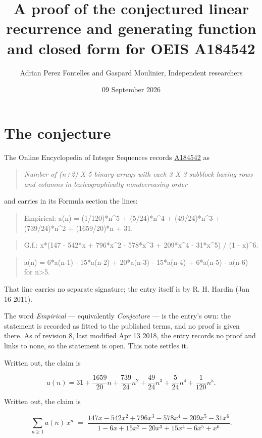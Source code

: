 \documentclass[11pt]{article}
\title{A proof of the conjectured linear recurrence and generating function and closed form for OEIS A184542}
\author{Adrian Perez Fontelles and Gaspard Moulinier, Independent researchers}
\date{09 September 2026}
\theoremstyle{definition}
\begin{document}
\maketitle
\section{The conjecture}

The Online Encyclopedia of Integer Sequences records \href{https://oeis.org/A184542}{A184542} as

\begin{quote}\itshape Number of (n+2) X 5 binary arrays with each 3 X 3 subblock having rows and columns in lexicographically nondecreasing order\end{quote}

and carries in its Formula section the lines:

\begin{quote}\ttfamily Empirical: a(n) = (1/120)*n\textasciicircum{}5 + (5/24)*n\textasciicircum{}4 + (49/24)*n\textasciicircum{}3 + (739/24)*n\textasciicircum{}2 + (1659/20)*n + 31.\end{quote}

\begin{quote}\ttfamily G.f.: x*(147 - 542*x + 796*x\textasciicircum{}2 - 578*x\textasciicircum{}3 + 209*x\textasciicircum{}4 - 31*x\textasciicircum{}5) / (1 - x)\textasciicircum{}6.\end{quote}

\begin{quote}\ttfamily a(n) = 6*a(n-1) - 15*a(n-2) + 20*a(n-3) - 15*a(n-4) + 6*a(n-5) - a(n-6) for n>5.\end{quote}

That line carries no separate signature; the entry itself is by R. H. Hardin (Jan 16 2011).

The word {\itshape Empirical} --- equivalently {\itshape Conjecture} --- is the entry's own: the statement is recorded as fitted to the published terms, and no proof is given there. As of revision 8, last modified Apr 13 2018, the entry records no proof and links to none, so the statement is open. This note settles it.

Written out, the claim is

\[a(n) = 31 + \frac{1659}{20}n + \frac{739}{24}n^{2} + \frac{49}{24}n^{3} + \frac{5}{24}n^{4} + \frac{1}{120}n^{5}.\]

Written out, the claim is

\[\sum_{n \ge 1} a(n)\,x^n \;=\; \frac{147x - 542x^{2} + 796x^{3} - 578x^{4} + 209x^{5} - 31x^{6}}{1 - 6x + 15x^{2} - 20x^{3} + 15x^{4} - 6x^{5} + x^{6}}.\]
\end{document}
